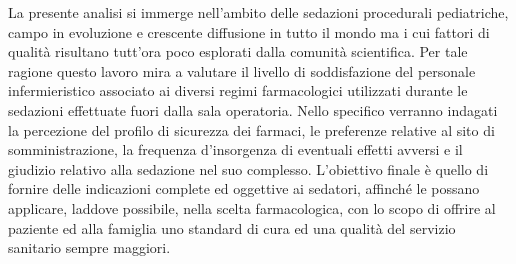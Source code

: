 La presente analisi si immerge nell'ambito delle sedazioni procedurali pediatriche, campo in evoluzione e crescente diffusione in tutto il mondo ma i cui fattori di qualità risultano tutt'ora poco esplorati dalla comunità scientifica.
Per tale ragione questo lavoro mira a valutare il livello di soddisfazione del personale infermieristico associato ai diversi regimi farmacologici utilizzati durante le sedazioni effettuate fuori dalla sala operatoria. Nello specifico verranno indagati la percezione del profilo di sicurezza dei farmaci, le preferenze relative al sito di somministrazione, la frequenza d'insorgenza di eventuali effetti avversi e il giudizio relativo alla sedazione nel suo complesso.
L'obiettivo finale è quello di fornire delle indicazioni complete ed oggettive ai sedatori, affinché le possano applicare, laddove possibile, nella scelta farmacologica, con lo scopo di offrire al paziente ed alla famiglia uno standard di cura ed una qualità del servizio sanitario sempre maggiori.





